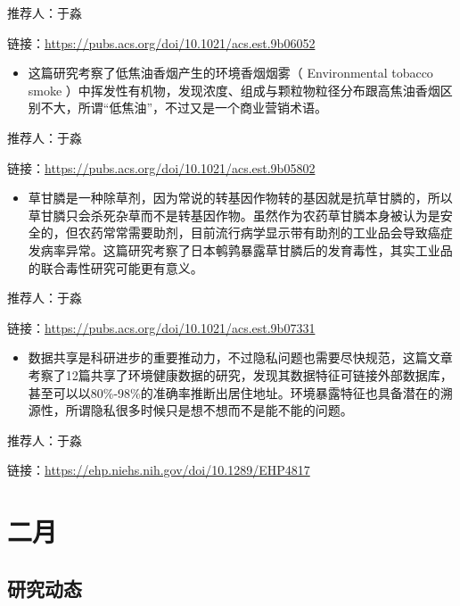 \documentclass[
]{book}
\providecommand{\tightlist}{%
  \setlength{\itemsep}{0pt}\setlength{\parskip}{0pt}}
\begin{document}
推荐人：于淼

链接：\url{https://pubs.acs.org/doi/10.1021/acs.est.9b06052}

\begin{itemize}
\tightlist
\item
  这篇研究考察了低焦油香烟产生的环境香烟烟雾（ Environmental tobacco smoke ）中挥发性有机物，发现浓度、组成与颗粒物粒径分布跟高焦油香烟区别不大，所谓``低焦油''，不过又是一个商业营销术语。
\end{itemize}

推荐人：于淼

链接：\url{https://pubs.acs.org/doi/10.1021/acs.est.9b05802}

\begin{itemize}
\tightlist
\item
  草甘膦是一种除草剂，因为常说的转基因作物转的基因就是抗草甘膦的，所以草甘膦只会杀死杂草而不是转基因作物。虽然作为农药草甘膦本身被认为是安全的，但农药常常需要助剂，目前流行病学显示带有助剂的工业品会导致癌症发病率异常。这篇研究考察了日本鹌鹑暴露草甘膦后的发育毒性，其实工业品的联合毒性研究可能更有意义。
\end{itemize}

推荐人：于淼

链接：\url{https://pubs.acs.org/doi/10.1021/acs.est.9b07331}

\begin{itemize}
\tightlist
\item
  数据共享是科研进步的重要推动力，不过隐私问题也需要尽快规范，这篇文章考察了12篇共享了环境健康数据的研究，发现其数据特征可链接外部数据库，甚至可以以80\%-98\%的准确率推断出居住地址。环境暴露特征也具备潜在的溯源性，所谓隐私很多时候只是想不想而不是能不能的问题。
\end{itemize}

推荐人：于淼

链接：\url{https://ehp.niehs.nih.gov/doi/10.1289/EHP4817}

\hypertarget{ux4e8cux6708-2}{%
\section*{二月}\label{ux4e8cux6708-2}}

\hypertarget{ux7814ux7a76ux52a8ux6001-27}{%
\subsection*{研究动态}\label{ux7814ux7a76ux52a8ux6001-27}}
\end{document}
